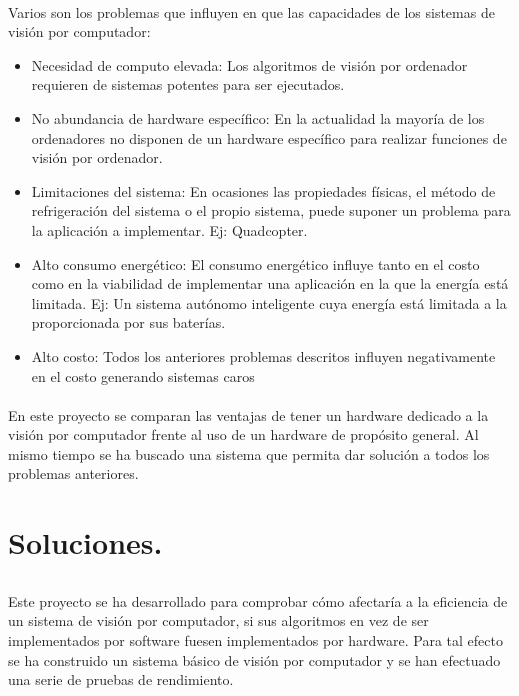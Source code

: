 \documentclass[a4paper,12pt,titlepage,final]{book}
\begin{document}
\paragraph{}
Varios son los problemas que influyen en que las capacidades de los sistemas de visión por computador:
\begin{itemize}
  \item Necesidad de computo elevada: Los algoritmos de visión por ordenador requieren de sistemas potentes para ser ejecutados.
  \item No abundancia de hardware específico: En la actualidad la mayoría de los ordenadores no disponen de un hardware específico para realizar funciones de visión por ordenador.
  \item Limitaciones del sistema: En ocasiones las propiedades físicas, el método de refrigeración del sistema o el propio sistema, puede suponer un problema para la aplicación a implementar. Ej: Quadcopter.
  \item Alto consumo energético: El consumo energético influye tanto en el costo como en la viabilidad de implementar una aplicación en la que la energía está limitada. Ej: Un sistema autónomo inteligente cuya energía está limitada a la proporcionada por sus baterías.
  \item Alto costo: Todos los anteriores problemas descritos influyen negativamente en el costo generando sistemas caros
\end{itemize}

\paragraph{}
En este proyecto se comparan las ventajas de tener un hardware dedicado a la visión por computador frente al uso de un hardware de propósito general. Al mismo tiempo se ha buscado una sistema que permita dar solución a todos los problemas anteriores.

\section{Soluciones.}
\subsection*{}
\subsubsection*{}

\paragraph{}
Este proyecto se ha desarrollado para comprobar cómo afectaría a la eficiencia de un sistema de visión por computador, si sus algoritmos en vez de ser implementados por software fuesen implementados por hardware. Para tal efecto se ha construido un sistema básico de visión por computador y se han efectuado una serie de pruebas de rendimiento.
\end{document}
